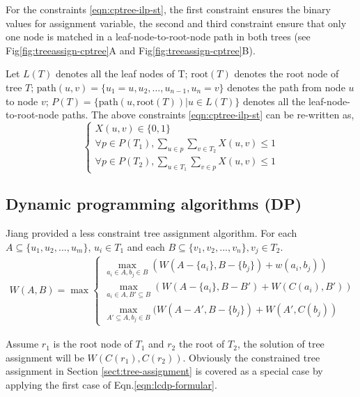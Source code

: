 For the constraints \ref{eqn:cptree-ilp-st}, the first constraint ensures the binary values for assignment variable, the second and third constraint ensure that only one node is matched in a leaf-node-to-root-node path in both trees (see Fig\ref{fig:treeassign-cptree}A and Fig\ref{fig:treeassign-cptree}B). 

Let $L(T)$ denotes all the leaf nodes of T; $\mathrm{root}(T)$ denotes the root node of tree $T$; $\mathrm{path}(u,v) = \{u_1 = u,u_2, \ldots, u_{n-1}, u_n = v\}$ denotes the path from node $u$ to node $v$; $P(T) = \{\mathrm{path}(u, \mathrm{root}(T))|u \in L(T)\}$ denotes all the leaf-node-to-root-node paths. The above constraints \ref{eqn:cptree-ilp-st} can be re-written as,
\begin{equation}
\left\{
\begin{array}{l}
X(u,v) \in \{0,1\} \\
\forall p \in P(T_1), \sum\limits_{u\in p}\sum\limits_{v \in T_2} X(u,v) \le 1 \\
\forall p \in P(T_2), \sum\limits_{u\in T_1}\sum\limits_{v \in p} X(u,v) \le 1 
\end{array}
\right.
\end{equation}

\subsection{Dynamic programming algorithms (DP)}
Jiang \cite{Jiang:95} provided a less constraint tree assignment algorithm.
For each $A \subseteq \{u_1,u_2,...,u_m\}$, $u_i \in T_1$ and each $B \subseteq \{v_1,v_2,...,v_n\}, v_j \in T_2$.
\begin{eqnarray} \label{eqn:lcdp-formular}
W(A,B) = \max \begin{cases}
\max\limits_{a_i \in A, b_j \in B}(W(A-\{a_i\}, B-\{b_j\}) + w(a_i,b_j))\\
\max\limits_{a_i \in A, B' \subseteq B}(W(A-\{a_i\}, B-B') + W(C(a_i), B')) \\
\max\limits_{A' \subseteq A, b_j \in B}(W(A-A', B-\{b_j\}) + W(A', C(b_j))
\end{cases} 
\end{eqnarray}

Assume $r_1$ is the root node of $T_1$ and $r_2$ the root of $T_2$, the solution of tree assignment will be $W(C(r_1), C(r_2))$.
Obviously the constrained tree assignment in Section \ref{sect:tree-assignment} is covered as a special case by applying the first case of Eqn.\eqref{eqn:lcdp-formular}. 

